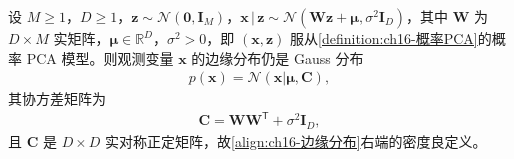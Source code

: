 \documentclass[../../main.tex]{subfiles}
\begin{document}
\begin{proposition}\label{proposition:ch16-边缘分布}
设 $M\geqslant1$，$D\geqslant1$，$\bm{z}\sim\mathcal{N}(\bm{0},\bm{I}_M)$，$\bm{x}\,|\,\bm{z}\sim\mathcal{N}(\bm{W}\bm{z}+\bm{\mu},\sigma^2\bm{I}_D)$，其中 $\bm{W}$ 为 $D\times M$ 实矩阵，$\bm{\mu}\in\mathbb{R}^{D}$，$\sigma^2>0$，即 $(\bm{x},\bm{z})$ 服从\cref{definition:ch16-概率PCA}的概率 PCA 模型。则观测变量 $\bm{x}$ 的边缘分布仍是 Gauss 分布
\begin{align}
  p(\bm{x})=\mathcal{N}(\bm{x}|\bm{\mu},\bm{C}),
  \label{align:ch16-边缘分布}
\end{align}
其协方差矩阵为
\begin{align}
  \bm{C}=\bm{W}\bm{W}^{\mathsf T}+\sigma^2\bm{I}_D,
  \label{align:ch16-边缘协方差}
\end{align}
且 $\bm{C}$ 是 $D\times D$ 实对称正定矩阵，故\eqref{align:ch16-边缘分布}右端的密度良定义。
\end{proposition}
\end{document}
